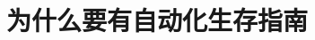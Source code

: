 \frontmatter

\chapter{为什么要有自动化生存指南}



\clearpage
{
  \hypersetup{hidelinks}
  \tableofcontents
}

\mainmatter
